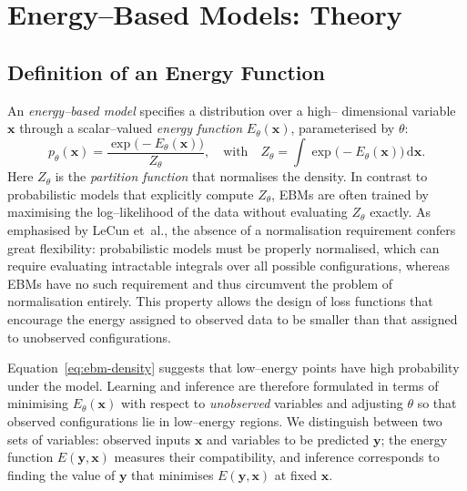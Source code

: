 

\section{Energy--Based Models: Theory}

\subsection{Definition of an Energy Function}

An \emph{energy–based model} specifies a distribution over a high–
dimensional variable $\mathbf{x}$ through a scalar–valued \emph{energy
function} $E_\theta(\mathbf{x})$, parameterised by $\theta$:
\begin{equation}
    p_\theta(\mathbf{x}) = \frac{\exp\big(-E_\theta(\mathbf{x})\big)}{Z_\theta},
    \quad \text{with} \quad Z_\theta = \int \exp\big(-E_\theta(\mathbf{x})\big)
    \,\mathrm{d}\mathbf{x}.
    \label{eq:ebm-density}
\end{equation}
Here $Z_\theta$ is the \emph{partition function} that normalises the density.
In contrast to probabilistic models that explicitly compute $Z_\theta$, EBMs
are often trained by maximising the log–likelihood of the data without
evaluating $Z_\theta$ exactly.  As emphasised by LeCun et~al., the absence
of a normalisation requirement confers great flexibility: probabilistic
models must be properly normalised, which can require evaluating
intractable integrals over all possible configurations, whereas EBMs have
no such requirement and thus circumvent the problem of normalisation
entirely.  This property allows the design of
loss functions that encourage the energy assigned to observed data to be
smaller than that assigned to unobserved configurations.

Equation~\eqref{eq:ebm-density} suggests that low–energy points have high
probability under the model.  Learning and inference are therefore
formulated in terms of minimising $E_\theta(\mathbf{x})$ with respect to
\emph{unobserved} variables and adjusting $\theta$ so that observed
configurations lie in low–energy regions.  We
distinguish between two sets of variables: observed inputs $\mathbf{x}$ and
variables to be predicted $\mathbf{y}$; the energy function $E(\mathbf{y},
\mathbf{x})$ measures their compatibility, and inference corresponds to
finding the value of $\mathbf{y}$ that minimises $E(\mathbf{y},\mathbf{x})$ at
fixed $\mathbf{x}$.

